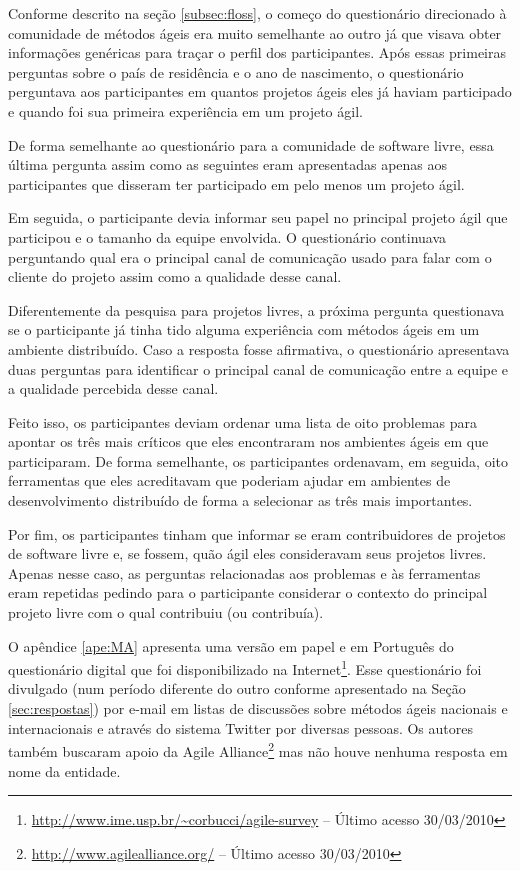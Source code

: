 Conforme descrito na seção \ref{subsec:floss}, o começo do
questionário direcionado à comunidade de métodos ágeis era muito
semelhante ao outro já que visava obter informações genéricas para
traçar o perfil dos participantes.  Após essas primeiras perguntas
sobre o país de residência e o ano de nascimento, o questionário
perguntava aos participantes em quantos projetos ágeis eles já haviam
participado e quando foi sua primeira experiência em um projeto ágil.

De forma semelhante ao questionário para a comunidade de software
livre, essa última pergunta assim como as seguintes eram apresentadas
apenas aos participantes que disseram ter participado em pelo menos um
projeto ágil.

Em seguida, o participante devia informar seu papel no principal
projeto ágil que participou e o tamanho da equipe envolvida. O
questionário continuava perguntando qual era o principal canal de
comunicação usado para falar com o cliente do projeto assim como a
qualidade desse canal.

Diferentemente da pesquisa para projetos livres, a próxima pergunta
questionava se o participante já tinha tido alguma experiência com
métodos ágeis em um ambiente distribuído. Caso a resposta fosse
afirmativa, o questionário apresentava duas perguntas para identificar
o principal canal de comunicação entre a equipe e a qualidade
percebida desse canal.

Feito isso, os participantes deviam ordenar uma lista de oito
problemas para apontar os três mais críticos que eles encontraram nos
ambientes ágeis em que participaram. De forma semelhante, os
participantes ordenavam, em seguida, oito ferramentas que eles
acreditavam que poderiam ajudar em ambientes de desenvolvimento
distribuído de forma a selecionar as três mais importantes.

Por fim, os participantes tinham que informar se eram contribuidores
de projetos de software livre e, se fossem, quão ágil eles
consideravam seus projetos livres. Apenas nesse caso, as perguntas
relacionadas aos problemas e às ferramentas eram repetidas pedindo
para o participante considerar o contexto do principal projeto livre
com o qual contribuiu (ou contribuía).

O apêndice \ref{ape:MA} apresenta uma versão em papel e em Português
do questionário digital que foi disponibilizado na
Internet\footnote{\url{http://www.ime.usp.br/~corbucci/agile-survey} --
  Último acesso 30/03/2010}. Esse questionário foi divulgado (num
período diferente do outro conforme apresentado na Seção
\ref{sec:respostas}) por e-mail em listas de discussões sobre métodos
ágeis nacionais e internacionais e através do sistema Twitter por
diversas pessoas. Os autores também buscaram apoio da Agile
Alliance\footnote{\url{http://www.agilealliance.org/} -- Último acesso
  30/03/2010} mas não houve nenhuma resposta em nome da entidade.


